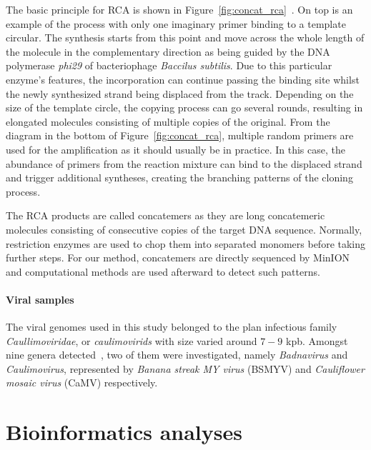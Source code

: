 The basic principle for RCA is shown in Figure~\ref{fig:concat_rca}~\cite{Johne2009rca}.
On top is an example of the process with only one imaginary primer binding to a template circular. The synthesis starts from this point and move across the whole length of the molecule in the complementary direction as being guided by the DNA polymerase  \emph{phi29} of bacteriophage \emph{Baccilus subtilis}.
Due to this particular enzyme's features, the incorporation can continue passing the binding site whilst the newly synthesized strand being displaced from the track.
Depending on the size of the template circle, the copying process can go several rounds, resulting in elongated molecules consisting of multiple copies of the original.
From the diagram in the bottom of Figure~\ref{fig:concat_rca}, multiple random primers are used for the amplification as it should usually be in practice. In this case, the abundance of primers from the reaction mixture can bind to the displaced strand and trigger additional syntheses, creating the branching patterns of the cloning process.

The RCA products are called concatemers as they are long concatemeric molecules consisting of consecutive copies of the target DNA sequence. Normally, restriction enzymes are used to chop them into separated monomers before taking further steps. For our method, concatemers are directly sequenced by MinION and computational methods are used afterward to detect such patterns.
\paragraph{Viral samples}
The viral genomes used in this study belonged to the plan infectious family \emph{Caullimoviridae}, or \emph{caulimovirids} with size varied around $7-9$ kpb.
Amongst nine genera detected~\cite{Geering2010ST,Mollov2013LZ}, two of them were investigated, namely \emph{Badnavirus} and \emph{Caulimovirus}, represented by \emph{Banana streak MY virus} (BSMYV) and \emph{Cauliflower mosaic virus} (CaMV) respectively.

\section{Bioinformatics analyses}

